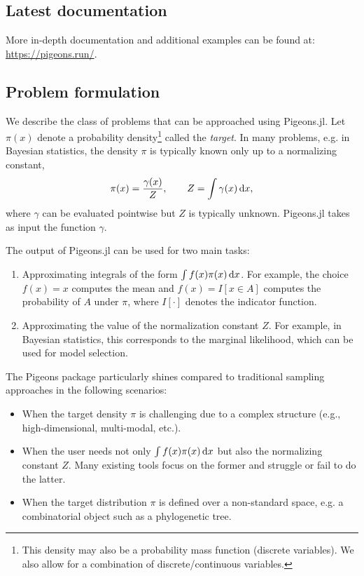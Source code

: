 \subsection{Latest documentation}

More in-depth documentation and additional examples can be found at: {\renewcommand{\UrlFont}{\ttfamily\normalsize}\url{https://pigeons.run/}}. 

\subsection{Problem formulation}
We describe the class of problems that can be approached using Pigeons.jl.
Let $\pi(x)$ denote a probability density\footnote{This density may 
also be a probability mass function 
(discrete variables). We also allow for a combination of discrete/continuous variables.} 
called the \emph{target}. 
In many problems, e.g. in Bayesian statistics, the density $\pi$ is typically 
known only up to a normalizing constant, 
\[
\label{eq:normalizing_constant}
  \pi(x) = \frac{\gamma(x)}{Z}, \qquad Z = \int \gamma(x) \, \dee x,
\]  
where $\gamma$ can be evaluated pointwise but $Z$ is typically unknown.
Pigeons.jl takes as input the function $\gamma$.

\medskip 
The output of Pigeons.jl can be used for two main tasks:
\begin{enumerate}
    \item Approximating integrals of the form $\int f(x) \pi(x) \, \mathrm{d} x$.  
    For example, the choice $f(x) = x$ computes the mean and 
    $f(x) = I[x \in A]$ computes the probability of $A$ under $\pi$,
    where $I[\cdot]$ denotes the indicator function.

    \item Approximating the value of the normalization constant $Z$. For 
    example, in Bayesian statistics, this corresponds to the 
    marginal likelihood, which can be used for model selection. 
\end{enumerate}
The Pigeons package particularly shines compared to traditional sampling approaches in the 
following scenarios:
\begin{itemize}
    \item When the target density $\pi$ is challenging due to a complex structure 
    (e.g., high-dimensional, multi-modal, etc.).
    
    \item When the user needs not only $\int f(x) \pi(x) \, \mathrm{d} x$ but also
    the normalizing constant $Z$. 
    Many existing tools focus on the former and struggle or fail to do the latter. 
    
    \item When the target distribution $\pi$ is defined over a non-standard space, 
    e.g. a combinatorial object such as a phylogenetic tree.  
\end{itemize}


